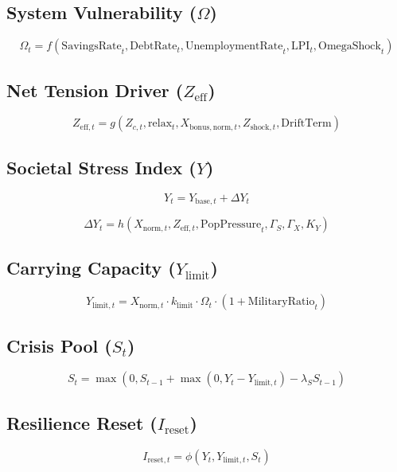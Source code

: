 \documentclass{article}
\begin{document}
\subsection{System Vulnerability ($\Omega$)}
\begin{equation}
\Omega_t = f \left( \mathrm{SavingsRate}_t, \mathrm{DebtRate}_t, \mathrm{UnemploymentRate}_t, \mathrm{LPI}_t, \mathrm{OmegaShock}_t \right)
\end{equation}

\subsection{Net Tension Driver ($Z_{\mathrm{eff}}$)}
\begin{equation}
Z_{\mathrm{eff},t} = g \left( Z_{c,t}, \mathrm{relax}_t, X_{\mathrm{bonus,norm},t}, Z_{\mathrm{shock},t}, \mathrm{DriftTerm} \right)
\end{equation}

\subsection{Societal Stress Index ($Y$)}
\begin{equation}
Y_t = Y_{\mathrm{base},t} + \Delta Y_t
\end{equation}

\begin{equation}
\Delta Y_t = h \left( X_{\mathrm{norm},t}, Z_{\mathrm{eff},t}, \mathrm{PopPressure}_t, \Gamma_S, \Gamma_X, K_Y \right)
\end{equation}
\subsection{Carrying Capacity ($Y_{\mathrm{limit}}$)}
\begin{equation}
Y_{\mathrm{limit},t} = X_{\mathrm{norm},t} \cdot k_{\mathrm{limit}} \cdot \Omega_t \cdot \left( 1 + \mathrm{MilitaryRatio}_t \right)
\end{equation}

\subsection{Crisis Pool ($S_t$)}
\begin{equation}
S_t = \max \left( 0, S_{t-1} + \max \left( 0, Y_t - Y_{\mathrm{limit},t} \right) - \lambda_S S_{t-1} \right)
\end{equation}

\subsection{Resilience Reset ($I_{\mathrm{reset}}$)}
\begin{equation}
I_{\mathrm{reset},t} = \phi \left( Y_t, Y_{\mathrm{limit},t}, S_t \right)
\end{equation}
\end{document}
